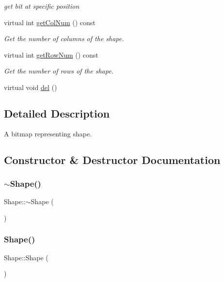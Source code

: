 \begin{DoxyCompactItemize}
\begin{DoxyCompactList}\small\item\em get bit at specific position \end{DoxyCompactList}\item 
virtual int \mbox{\hyperlink{class_shape_a7f6887a6b1b1dfa6b7471edb4a582731}{get\+Col\+Num}} () const
\begin{DoxyCompactList}\small\item\em Get the number of columns of the shape. \end{DoxyCompactList}\item 
virtual int \mbox{\hyperlink{class_shape_a849c13a51a231c2ecb364efc3ff3f1ae}{get\+Row\+Num}} () const
\begin{DoxyCompactList}\small\item\em Get the number of rows of the shape. \end{DoxyCompactList}\item 
virtual void \mbox{\hyperlink{class_shape_a7f336c18e4bbd3035542037862d0eec7}{del}} ()
\end{DoxyCompactItemize}


\subsection{Detailed Description}
A bitmap representing shape. 

\subsection{Constructor \& Destructor Documentation}
\mbox{\label{class_shape_a935afc9e576015f967d90de56977167d}} 
\subsubsection{\texorpdfstring{$\sim$\+Shape()}{~Shape()}}
{\footnotesize\ttfamily Shape\+::$\sim$\+Shape (\begin{DoxyParamCaption}{ }\end{DoxyParamCaption})\hspace{0.3cm}{\ttfamily [virtual]}}

\mbox{\label{class_shape_aaa8d87171e65e0d8ba3c5459978992a7}} 
\subsubsection{\texorpdfstring{Shape()}{Shape()}\hspace{0.1cm}{\footnotesize\ttfamily [1/3]}}
{\footnotesize\ttfamily Shape\+::\+Shape (\begin{DoxyParamCaption}{ }\end{DoxyParamCaption})}

